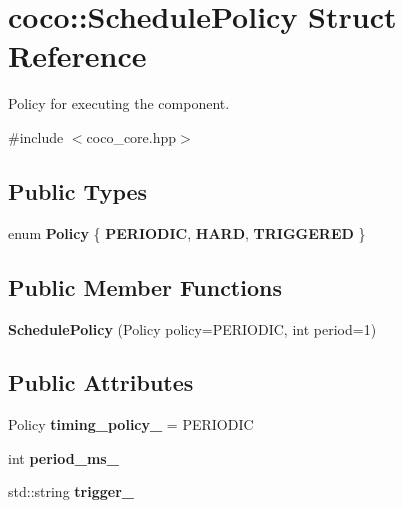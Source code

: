\hypertarget{structcoco_1_1_schedule_policy}{}\section{coco\+:\+:Schedule\+Policy Struct Reference}
\label{structcoco_1_1_schedule_policy}


Policy for executing the component.  




{\ttfamily \#include $<$coco\+\_\+core.\+hpp$>$}

\subsection*{Public Types}
\begin{DoxyCompactItemize}
\item 
\hypertarget{structcoco_1_1_schedule_policy_a6a4bf64ffa07d513c63e8836f32e2fc4}{}enum {\bfseries Policy} \{ {\bfseries P\+E\+R\+I\+O\+D\+I\+C}, 
{\bfseries H\+A\+R\+D}, 
{\bfseries T\+R\+I\+G\+G\+E\+R\+E\+D}
 \}\label{structcoco_1_1_schedule_policy_a6a4bf64ffa07d513c63e8836f32e2fc4}

\end{DoxyCompactItemize}
\subsection*{Public Member Functions}
\begin{DoxyCompactItemize}
\item 
\hypertarget{structcoco_1_1_schedule_policy_a10ca5e9aacf647c410a160cf6981ba1b}{}{\bfseries Schedule\+Policy} (Policy policy=P\+E\+R\+I\+O\+D\+I\+C, int period=1)\label{structcoco_1_1_schedule_policy_a10ca5e9aacf647c410a160cf6981ba1b}

\end{DoxyCompactItemize}
\subsection*{Public Attributes}
\begin{DoxyCompactItemize}
\item 
\hypertarget{structcoco_1_1_schedule_policy_ab1d0eb6297cf9b1630d56b24ca56e0ce}{}Policy {\bfseries timing\+\_\+policy\+\_\+} = P\+E\+R\+I\+O\+D\+I\+C\label{structcoco_1_1_schedule_policy_ab1d0eb6297cf9b1630d56b24ca56e0ce}

\item 
\hypertarget{structcoco_1_1_schedule_policy_a1c4cad7562e9b30fdae43e8be3708b6e}{}int {\bfseries period\+\_\+ms\+\_\+}\label{structcoco_1_1_schedule_policy_a1c4cad7562e9b30fdae43e8be3708b6e}

\item 
\hypertarget{structcoco_1_1_schedule_policy_ac2019bc1c226a87b984d6e4a40a3219f}{}std\+::string {\bfseries trigger\+\_\+}\label{structcoco_1_1_schedule_policy_ac2019bc1c226a87b984d6e4a40a3219f}

\end{DoxyCompactItemize}


